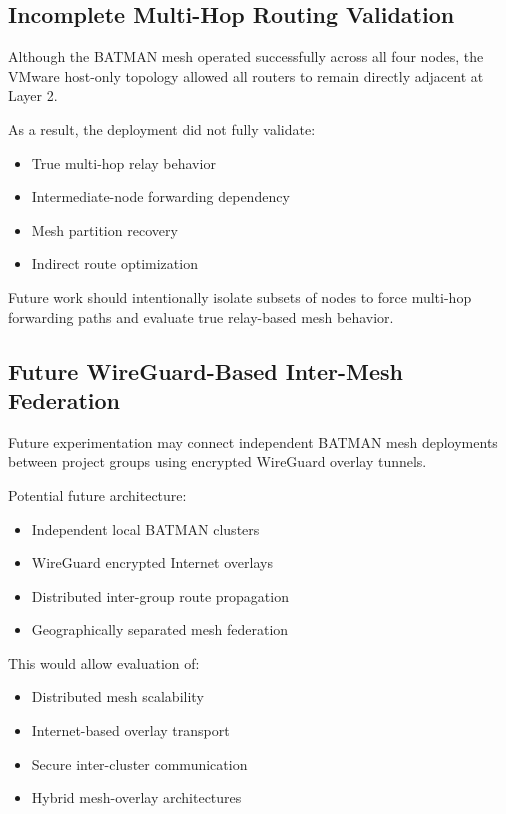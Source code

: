 \documentclass[conference]{IEEEtran}
\begin{document}
\subsection{Incomplete Multi-Hop Routing Validation}

Although the BATMAN mesh operated successfully across all four nodes, the VMware host-only topology allowed all routers to remain directly adjacent at Layer 2.

As a result, the deployment did not fully validate:

\begin{itemize}
    \item True multi-hop relay behavior
    \item Intermediate-node forwarding dependency
    \item Mesh partition recovery
    \item Indirect route optimization
\end{itemize}

Future work should intentionally isolate subsets of nodes to force multi-hop forwarding paths and evaluate true relay-based mesh behavior.

\subsection{Future WireGuard-Based Inter-Mesh Federation}

Future experimentation may connect independent BATMAN mesh deployments between project groups using encrypted WireGuard overlay tunnels.

Potential future architecture:

\begin{itemize}
    \item Independent local BATMAN clusters
    \item WireGuard encrypted Internet overlays
    \item Distributed inter-group route propagation
    \item Geographically separated mesh federation
\end{itemize}

This would allow evaluation of:
\begin{itemize}
    \item Distributed mesh scalability
    \item Internet-based overlay transport
    \item Secure inter-cluster communication
    \item Hybrid mesh-overlay architectures
\end{itemize}
\end{document}
